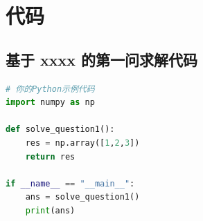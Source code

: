 \section*{代码}

\subsection*{基于 xxxx 的第一问求解代码}
\begin{lstlisting}[language=Python]
# 你的Python示例代码
import numpy as np

def solve_question1():
    res = np.array([1,2,3])
    return res

if __name__ == "__main__":
    ans = solve_question1()
    print(ans)
\end{lstlisting}